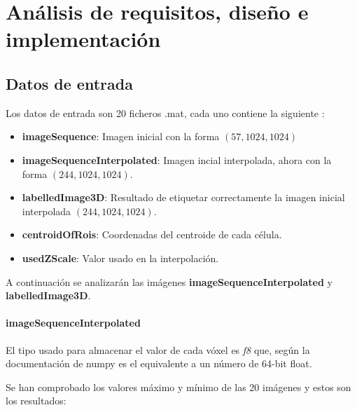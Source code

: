 \chapter{An\'alisis de requisitos, dise\~no e implementaci\'on}\label{requisitos}

\section{Datos de entrada}\label{sub:datos_entrada}

Los datos de entrada son 20 ficheros .mat, cada uno contiene la siguiente :

\begin{itemize}
\item \textbf{imageSequence}: Imagen inicial con la forma $ (57, 1024, 1024) $
\item \textbf{imageSequenceInterpolated}: Imagen incial interpolada, ahora con la forma $ (244, 1024, 1024) $.
\item \textbf{labelledImage3D}: Resultado de etiquetar correctamente la imagen inicial interpolada $ (244, 1024, 1024) $.
\item \textbf{centroidOfRois}: Coordenadas del centroide de cada célula.
\item \textbf{usedZScale}: Valor usado en la interpolación.
\end{itemize}

A continuación se analizarán las imágenes \textbf{imageSequenceInterpolated} y \textbf{labelledImage3D}.

\subsubsection{imageSequenceInterpolated}

El tipo usado para almacenar el valor de cada vóxel es \textit{f8} que, según la documentación de numpy es el equivalente a un número de 64-bit float.

Se han comprobado los valores máximo y mínimo de las 20 imágenes y estos son los resultados:


